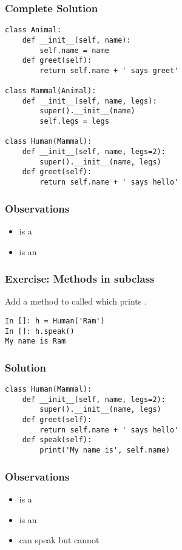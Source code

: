 \documentclass[14pt,compress,aspectratio=169]{beamer}
\begin{document}
\begin{frame}
  \frametitle{Complete Solution}
  \vspace*{-0.1in}
  \small
\begin{lstlisting}
class Animal:
    def __init__(self, name):
        self.name = name
    def greet(self):
        return self.name + ' says greet'

class Mammal(Animal):
    def __init__(self, name, legs):
        super().__init__(name)
        self.legs = legs

class Human(Mammal):
    def __init__(self, name, legs=2):
        super().__init__(name, legs)
    def greet(self):
        return self.name + ' says hello'
\end{lstlisting}
\end{frame}

\begin{frame}
  \frametitle{Observations}
  \begin{itemize}
  \item {} is a 
  \item {} is an 
  \end{itemize}
\end{frame}


\begin{frame}
  \frametitle{Exercise: Methods in subclass}
  \begin{block}{}
    Add a method to  called  which prints
    .
  \end{block}

\begin{lstlisting}
In []: h = Human('Ram')
In []: h.speak()
My name is Ram
\end{lstlisting}
\end{frame}


\begin{frame}
  \frametitle{Solution}
\begin{lstlisting}
class Human(Mammal):
    def __init__(self, name, legs=2):
        super().__init__(name, legs)
    def greet(self):
        return self.name + ' says hello'
    def speak(self):
        print('My name is', self.name)
\end{lstlisting}
\end{frame}

\begin{frame}
  \frametitle{Observations}
  \begin{itemize}
  \item {} is a 
  \item {} is an 
  \item {} can speak but  cannot
  \end{itemize}
\end{frame}
\end{document}
